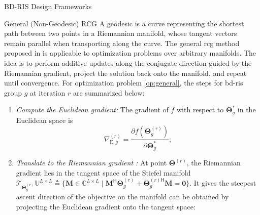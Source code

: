 \begin{section}{BD-RIS Design Frameworks}
	\begin{subsection}{General (Non-Geodesic) RCG}
		A geodesic is a curve representing the shortest path between two points in a Riemannian manifold, whose tangent vectors remain parallel when transporting along the curve.
		The general \gls{rcg} method proposed in \cite{Absil2009,Pan2022d} is applicable to optimization problems over arbitrary manifolds.
		The idea is to perform {additive} updates along the conjugate direction guided by the Riemannian gradient, {project} the solution back onto the manifold, and repeat until convergence.
		For optimization problem \eqref{op:general}, the steps for \gls{bd}-\gls{ris} group $g$ at iteration $r$ are summarized below:
		\begin{enumerate}
		\item \emph{Compute the Euclidean gradient:} The gradient of $f$ with respect to $\mathbf{\Theta}_g^*$ in the Euclidean space is
			\begin{equation}
				\nabla_{\mathrm{E},g}^{(r)} = \frac{\partial f(\mathbf{\Theta}_g^{(r)})}{\partial \mathbf{\Theta}_g^*};
				\label{eq:gradient_euclidean}
			\end{equation}
		\item \emph{Translate to the Riemannian gradient \cite{Absil2009}:} At point $\mathbf{\Theta}^{(r)}$, the Riemannian gradient lies in the tangent space of the Stiefel manifold $\mathcal{T}_{\mathbf{\Theta}_g^{(r)}}\mathbb{U}^{L \times L} \triangleq \{\mathbf{M} \in \mathbb{C}^{L \times L} \mid \mathbf{M}^\mathsf{H} \mathbf{\Theta}_g^{(r)} + {\mathbf{\Theta}_g^{(r)\mathsf{H}}} \mathbf{M} = \mathbf{0}\}$. It gives the steepest ascent direction of the objective on the manifold can be obtained by projecting the Euclidean gradient onto the tangent space:
			\begin{equation}

\end{equation}
\end{enumerate}
\end{subsection}
\end{section}
